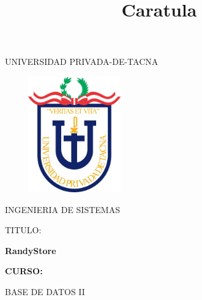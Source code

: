 \documentclass[12pt,letterpaper]{article}
\begin{document}
%


\title{Caratula}

\begin{titlepage}
\begin{center}
\large{UNIVERSIDAD PRIVADA-DE-TACNA}\\
\vspace*{-0.025in}
\begin{figure}[htb]
\begin{center}

\end{center}
\end{figure}
\begin{center}
    \includegraphics[width=6cm, height=5cm]{img/upt.jpg}  
\end{center}

\vspace*{0.15in}
INGENIERIA DE SISTEMAS  \\

\vspace*{0.5in}
\begin{large}
TITULO:\\
\end{large}

\vspace*{0.1in}
\begin{Large}
\textbf{ RandyStore} \\
\end{Large}

\vspace*{0.3in}
\begin{Large}
\textbf{CURSO:} \\
\end{Large}

\vspace*{0.1in}
\begin{large}
BASE DE DATOS II\\
\end{large}


\end{center}
\end{titlepage}
\end{document}

